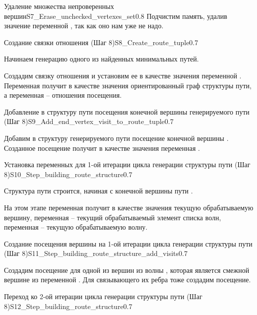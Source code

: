 \begin{itemize}
\begin{algostep}{Удаление множества непроверенных
    вершин}{S7_Erase_unchecked_vertexes_set}{0.8}
  Подчистим память, удалив значение переменной
  , так как оно нам уже не надо.
\end{algostep}


\begin{algostep}{Создание связки отношения  (Шаг
    8)}{S8_Create_route_tuple}{0.7}
 
  Начинаем генерацию одного из найденных минимальных путей.

  Создадим связку отношения  и установим ее в качестве
  значения переменной . Переменная 
  получит в качестве значения ориентированный граф структуры пути, а
  переменная  – отношения посещения.
\end{algostep}


\begin{algostep}{Добавление в структуру пути посещения конечной
    вершины генерируемого пути (Шаг
    8)}{S9_Add_end_vertex_visit_to_route_tuple}{0.7}
 
  Добавим в структуру генерируемого пути посещение конечной вершины
  . Созданное посещение получит в качестве значения переменная
  .
\end{algostep}


\begin{algostep}{Установка переменных для 1-ой итерации цикла генерации
    структуры пути (Шаг 8)}{S10_Step_building_route_structure}{0.7}
  
  Структура пути строится, начиная с конечной вершины пути .

  На этом этапе переменная  получит в качестве
  значения текущую обрабатываемую вершину, переменная 
  – текущий обрабатываемый элемент списка волн, переменная
   – текущую обрабатываемую волну.
\end{algostep}


\begin{algostep}{Создание посещения вершины на 1-ой итерации цикла
    генерации структуры пути (Шаг
    8)}{S11_Step_building_route_structure_add_visits}{0.7}
 
  Создадим посещение для одной из вершин из волны ,
  которая является смежной вершине из переменной
  . Для связывающего их ребра тоже создадим
  посещение.
\end{algostep}  


\begin{algostep}{Переход ко 2-ой итерации цикла генерации структуры
    пути (Шаг 8)}{S12_Step_building_route_structure}{0.7}
 

\end{algostep}
\end{itemize}
